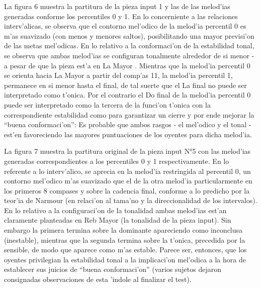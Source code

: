 \begin{imagen}
    \width{12cm}
\end{imagen}

La figura 6 muestra la partitura de la pieza input 1 y las de las melod'ias generadas conforme los percentiles 0 y 1. En lo concerniente a las relaciones interv'alicas, 
se observa que el contorno mel'odico de la melod'ia percentil 0 es m'as suavizado (con menos y menores saltos), posibilitando una mayor previsi'on de las metas mel'odicas. 
En lo relativo a la conformaci'on de la estabilidad tonal, se observa que ambas melod'ias se configuran tonalmente alrededor de si menor - a pesar de que la pieza est'a en 
La Mayor . Mientras que la melod'ia percentil 0 se orienta hacia La Mayor a partir del comp'as 11, la melod'ia percentil 1, permanece en si menor hasta el final, de tal suerte
que el La final no puede ser interpretado como t'onica. Por el contrario el Do final de la melod'ia percentil 0 puede ser interpretado como la tercera de la funci'on t'onica 
con la correspondiente estabilidad como para garantizar un cierre y por ende mejorar la ``buena conformaci'on'': Es probable que ambos rasgos - el mel'odico y el tonal - 
est'en favoreciendo las mayores puntuaciones de los oyentes para dicha melod'ia.

\begin{imagen}
    \width{12cm}
\end{imagen}

La figura 7 muestra la partitura original de la pieza input N°5 con las melod'ias generadas correspondientes a los percentiles 0 y 1 respectivamente. 
En lo referente a lo interv'alico, se aprecia en la melod'ia restringida al percentil 0, un contorno mel'odico m'as suavizado que el de la otra melod'ia particularmente 
en los primeros 8 compases y sobre la cadencia final, conforme a lo predicho por la teor'ia de Narmour (en relaci'on al tama'no y la direccionalidad de los intervalos). 
En lo relativo a la configuraci'on de la tonalidad ambas melod'ias est'an claramente planteadas en Reb Mayor (la tonalidad de la pieza input). 
Sin embargo la primera termina sobre la dominante apareciendo como inconclusa (inestable), mientras que la segunda termina sobre la t'onica, precedida por la sensible, 
de modo que aparece como m'as estable. Parece ser, entonces, que los oyentes privilegian la estabilidad tonal a la implicaci'on mel'odica a la hora de establecer sus 
juicios de ``buena conformaci'on'' (varios sujetos dejaron consignadas observaciones de esta 'indole al finalizar el test).

